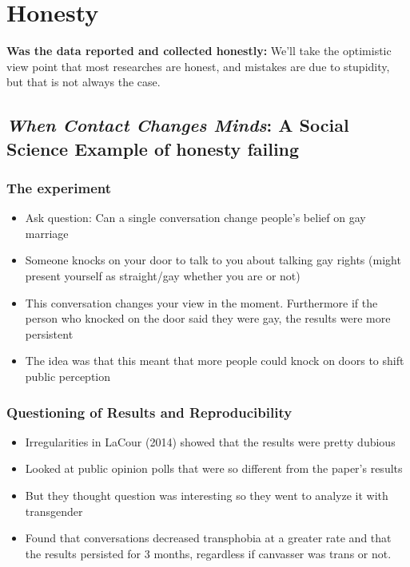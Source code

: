 \section{Honesty}
\textbf{Was the data reported and collected honestly:} 
We’ll take the optimistic view point that most researches are honest, and mistakes are due to stupidity, but that is not always the case.

\subsection{ \textit{When Contact Changes Minds}: A Social Science Example of honesty failing}
\subsubsection{The experiment}
\begin{itemize}
    \item{Ask question: Can a single conversation change people’s belief on gay marriage}
    
    \item{Someone knocks on your door to talk to you about talking gay rights (might present yourself as straight/gay whether you are or not)}
    
    \item {This conversation changes your view in the moment. Furthermore if the person who knocked on the door said they were gay, the results were more persistent}
    
    \item The idea was that this meant that more people could knock on doors to shift public perception
    
\end{itemize}

\subsubsection{Questioning of Results and Reproducibility}
\begin{itemize}
    \item{Irregularities in LaCour (2014) showed that the results were pretty dubious}
    
    \item Looked at public opinion polls that were so different from the paper’s results
    
    \item But they thought question was interesting so they went to analyze it with transgender

    \item {Found that conversations decreased transphobia at a greater rate and that the results persisted for 3 months, regardless if canvasser was trans or not.\\}
    
\end{itemize}
